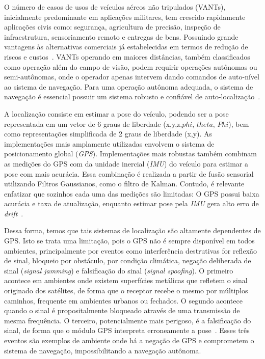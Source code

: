 O número de casos de usos de veículos aéreos não tripulados (VANTs), inicialmente predominante em aplicações militares, tem crescido rapidamente aplicações civis como: segurança, agricultura de precisão, inspeção de infraestrutura, sensoriamento remoto e entregas de bens. Possuindo grande vantagens às alternativas comerciais já estabelecidas em termos de redução de riscos e custos~\cite{8682048}. VANTs operando em maiores distâncias, também classificados como operação além do campo de visão, podem requirir operações autônomas ou semi-autônomas, onde o operador apenas intervem dando comandos de auto-nível ao sistema de navegação. Para uma operação autônoma adequada, o sistema de navegação é essencial possuir um sistema robusto e confiável de auto-localização~\cite{COUTURIER2021103666}.

A localização consiste em estimar a pose do veículo, podendo ser a pose representada em um vetor de 6 graus de liberdade (x,y,z,\(phi\), \(theta\), \(Phi\)), bem como representações simplificada de 2 graus de liberdade (x,y).
As implementações mais amplamente utilizadas envolvem o sistema de posicionamento global (\textit{GPS}). Implementações mais robustas também combinam as medições do GPS com da unidade inercial (\textit{IMU}) do veículo para estimar a pose com mais acurácia. Essa combinação é realizada a partir de fusão sensorial utilizando Filtros Gaussianos, como o filtro de Kalman. Contudo, é relevante enfatizar que sozinhos cada uma das medições são limitadas: O GPS possui baixa acurácia e taxa de atualização, enquanto estimar pose pela \textit{IMU} gera alto erro de \textit{drift}~\cite{COUTURIER2021103666}.

Dessa forma, temos que tais sistemas de localização são altamente dependentes de GPS. Isto se trata uma limitação, pois o GPS não é sempre disponível em todos ambientes, principalmente por eventos como interferência destrutivas for reflexão de sinal, bloqueio por obstáculo, por condição climática, negação deliberada de sinal (\textit{signal jamming}) e falsificação do sinal (\textit{signal spoofing}).
O primeiro acontece em ambientes onde existem superfícies metálicas que refletem o sinal originado dos satélites, de forma que o receptor recebe o mesmo por múltiplos caminhos, frequente em ambientes urbanos ou fechados. O segundo acontece quando o sinal é propositalmente bloqueado através de uma transmissão de mesma frequência. O terceiro, potencialmente mais perigoso, é a falsificação do sinal, de forma que o módulo GPS interpreta erroneamente a pose~\cite{6837385}. Esses três eventos são exemplos de ambiente onde há a negação de GPS e comprometem o sistema de navegação, impossibilitando a navegação autônoma.

